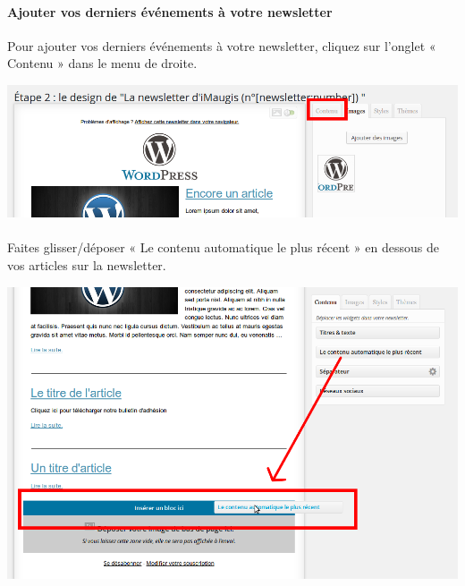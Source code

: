 \documentclass[10pt,a4paper]{article}
\begin{document}
\paragraph{Ajouter vos derniers événements à votre newsletter} Pour ajouter vos derniers événements à votre newsletter, cliquez sur l'onglet « Contenu » dans le menu de droite.
\begin{center}
\includegraphics[scale=0.3]{img/0228.png}
\end{center}
\paragraph{}Faites glisser/déposer « Le contenu automatique le plus récent » en dessous de vos articles sur la newsletter.
\begin{center}
\includegraphics[scale=0.3]{img/0229.png}
\end{center}
\end{document}
